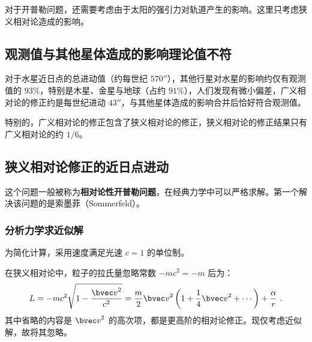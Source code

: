 



对于开普勒问题，还需要考虑由于太阳的强引力对轨道产生的影响。这里只考虑狭义相对论造成的影响。

\subsection{观测值与其他星体造成的影响理论值不符}
对于水星近日点的总进动值（约每世纪 $570''$），其他行星对水星的影响约仅有观测值的 $93 \%$，特别是木星、金星与地球（占约 $91\%$），人们发现有微小偏差，广义相对论的修正约是每世纪进动 $43''$，与其他星体造成的影响合并后恰好符合观测值。

特别的，广义相对论的修正包含了狭义相对论的修正，狭义相对论的修正结果只有广义相对论的约 $1/6$。

\subsection{狭义相对论修正的近日点进动}
这个问题一般被称为\textbf{相对论性开普勒问题}，在经典力学中可以严格求解。第一个解决该问题的是索墨菲（Sommerfeld）。

\subsubsection{分析力学求近似解}
为简化计算，采用速度满足光速 $c=1$ 的单位制。

在狭义相对论中，粒子的拉氏量忽略常数 $-mc^2 = -m$ 后为：
$$L = -mc^2 \sqrt{1- \frac{{\bvec v}^2}{c^2}} = \frac{m}{2} {\bvec v}^2 \left( 1+\frac{1}{4} {\bvec v}^2 + \cdots \right) + \frac{\alpha}{r} ~.$$
其中省略的内容是 ${\bvec v}^2$ 的高次项，都是更高阶的相对论修正。现仅考虑近似解，故将其忽略。

